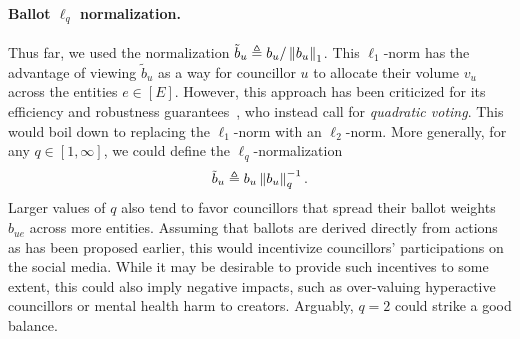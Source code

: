 \paragraph{Ballot $\ell_q$ normalization.}
Thus far, we used the normalization $\tilde b_u \triangleq b_u / \left\lVert{b_u}\right\rVert_{1}$.
This $\ell_1$-norm has the advantage of viewing $\tilde b_u$
as a way for councillor $u$ to allocate their volume $v_u$ across the entities $e \in [E]$.
However, this approach has been criticized 
for its efficiency and robustness guarantees~\cite{lalley2018quadratic},
who instead call for \emph{quadratic voting}.
This would boil down to replacing the $\ell_1$-norm with an $\ell_2$-norm.
More generally, for any $q \in [1, \infty]$,
we could define the $\ell_q$-normalization
\begin{align}
    \tilde b_u \triangleq b_u \left\lVert{b_u}\right\rVert_{q}^{-1}.
\end{align}
Larger values of $q$ also tend to favor councillors that spread their ballot weights $b_{ue}$
across more entities.
Assuming that ballots are derived directly from actions as has been proposed earlier,
this would incentivize councillors' participations on the social media.
While it may be desirable to provide such incentives to some extent,
this could also imply negative impacts,
such as over-valuing hyperactive councillors or mental health harm to creators.
Arguably, $q=2$ could strike a good balance.

